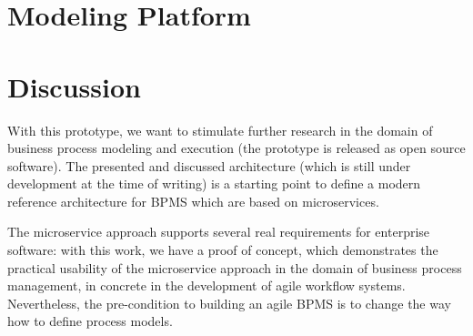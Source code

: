 \documentclass[conference]{IEEEtran}
\begin{document}
\section{Modeling Platform}
\label{ModelingPlatform}


\section{Discussion} 

With this prototype, we want to stimulate further research in the domain of business process modeling and execution (the prototype is released as open source software). The presented and discussed architecture (which is still under development at the time of writing) is a starting point to define a modern reference architecture for BPMS which are based on microservices. 

The microservice approach supports several real requirements for enterprise software: with this work, we have a proof of concept, which demonstrates the practical usability of the microservice approach in the domain of business process management, in concrete in the development of agile workflow systems. Nevertheless, the pre-condition to building an agile BPMS is to change the way how to define process models.



\end{document}
